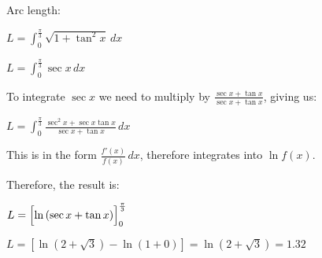 \documentclass[../main.tex]{subfiles}
\begin{document}
\begin{enumerate}[itemsep=0.7cm]
    Arc length:

    $L=\int_0^{\frac{\pi}{3}} \sqrt{1+\tan^2{x}}\,dx$

    $L=\int_0^{\frac{\pi}{3}} \sec{x}\,dx$

    To integrate $\sec{x}$ we need to multiply by $\frac{\sec{x}+\tan{x}}{\sec{x}+\tan{x}}$, giving us:

    $L=\int_0^{\frac{\pi}{3}} \frac{\sec^2{x}+\sec{x}\tan{x}}{\sec{x}+\tan{x}}\,dx$

    This is in the form $\frac{f'(x)}{f(x)}\,dx$, therefore integrates into $\ln{f(x)}$.

    Therefore, the result is:

    $L= \Bigl[\ln{(\sec{x}+\tan{x})}\Bigr]_0^{\frac{\pi}{3}}$

    $L=[\ln{(2+\sqrt{3})}-\ln{(1+0)}]=\ln{(2+\sqrt{3})}=1.32$

\end{enumerate}
\end{document}
